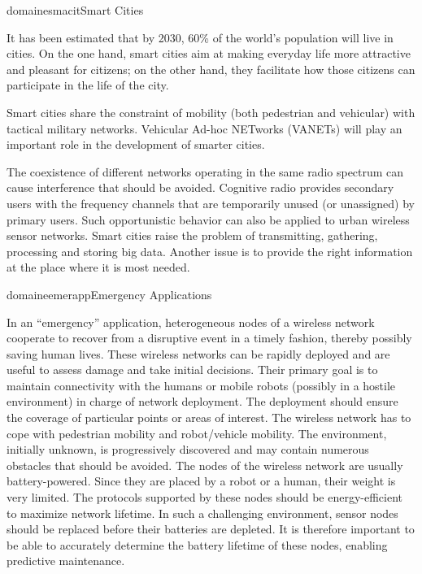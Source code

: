 \documentclass{ra2016}
\begin{document}
\begin{module}{domaine}{smacit}{Smart Cities}

It has been estimated that by 2030, 60\% of the world's population will live in cities.
On the one hand, smart cities aim at making everyday life more attractive and pleasant for citizens; on the other hand, they facilitate how those citizens can participate in the life of the city.

Smart cities share the constraint of mobility (both pedestrian and vehicular) with tactical military networks.
Vehicular Ad-hoc NETworks (VANETs) will play an important role in the development of smarter cities.

The coexistence of different networks operating in the same radio spectrum can cause interference that should be avoided.
Cognitive radio provides secondary users with the frequency channels that are temporarily unused (or unassigned) by primary users.
Such opportunistic behavior can also be applied to urban wireless sensor networks.
Smart cities raise the problem of transmitting, gathering, processing and storing big data.
Another issue is to provide the right information at the place where it is most needed.

\end{module}

\begin{module}{domaine}{emerapp}{Emergency Applications}

In an ``emergency'' application, heterogeneous nodes of a wireless network cooperate to recover from a disruptive event in a timely fashion, thereby possibly saving human lives.
These wireless networks can be rapidly deployed and are useful to assess damage and take initial decisions.
Their primary goal is to maintain connectivity with the humans or mobile robots (possibly in a hostile environment) in charge of network deployment. 
The deployment should ensure the coverage of particular points or areas of interest.
The wireless network has to cope with pedestrian mobility and robot/vehicle mobility.
The environment, initially unknown, is progressively discovered and may contain numerous obstacles that should be avoided.
The nodes of the wireless network are usually battery-powered.
Since they are placed by a robot or a human, their weight is very limited.
The protocols supported by these nodes should be energy-efficient to maximize network lifetime.
In such a challenging environment, sensor nodes should be replaced before their batteries are depleted.
It is therefore important to be able to accurately determine the battery lifetime of these nodes, enabling predictive maintenance.

\end{module}
\end{document}

